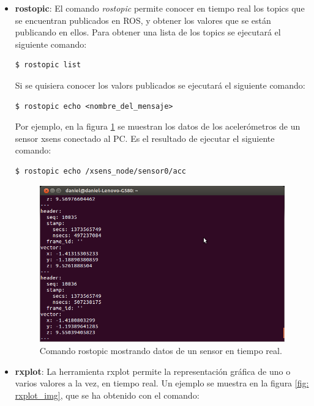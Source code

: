 \documentclass[12pt, a4paper]{report}
\begin{document}
\begin{itemize}
\begin{itemize}
\item \textbf{rostopic}: El comando \textit{rostopic} permite conocer en tiempo real los topics que se encuentran publicados en ROS, y obtener los valores que se están publicando en ellos. Para obtener una lista de los topics se ejecutará el siguiente comando:

\begin{verbatim}
$ rostopic list
\end{verbatim}

Si se quisiera conocer los valors publicados se ejecutará el siguiente comando:

\begin{verbatim}
$ rostopic echo <nombre_del_mensaje>
\end{verbatim}

Por ejemplo, en la figura \ref{fig: rostopic_img} se muestran los datos de los acelerómetros de un sensor xsens conectado al PC. Es el resultado de ejecutar el siguiente comando:

\begin{verbatim}
$ rostopic echo /xsens_node/sensor0/acc
\end{verbatim}

\begin{figure}[h]
	\centering
		\includegraphics[scale=0.4]{../img/rostopic_img.png} 
	\caption[Comando rostopic mostrando datos de un sensor]{Comando rostopic mostrando datos de un sensor en tiempo real.} 
	\label{fig: rostopic_img}
\end{figure}

\item \textbf{rxplot}: La herramienta rxplot permite la representación gráfica de uno o varios valores a la vez, en tiempo real. Un ejemplo se muestra en la figura \ref{fig: rxplot_img}, que se ha obtenido con el comando:


\end{itemize}
\end{itemize}
\end{document}
